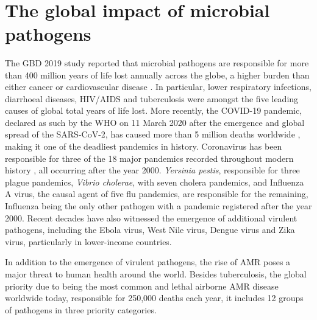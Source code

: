 \mbox{}\\
\vspace{8cm}

\section{The global impact of microbial pathogens} \label{sec:_intro_global_impact}

The \ac{GBD} 2019 study reported that microbial pathogens are responsible for more than 400 million years of life lost annually across the globe, a higher burden than either cancer or cardiovascular disease \citep{vos_global_2020}. 
In particular, lower respiratory infections, diarrhoeal diseases, HIV/AIDS and tuberculosis were amongst the five leading causes of global total years of life lost. 
More recently, the COVID-19 pandemic, declared as such by the \ac{WHO} on 11 March 2020 after the emergence and global spread of the \ac{SARS-CoV-2}, has caused more than 5 million deaths worldwide \citep{ritchie_coronavirus_2020}, making it one of the deadliest pandemics in history.
Coronavirus has been responsible for three of the 18 major pandemics recorded throughout modern history \citep{piret_pandemics_2021}, all occurring after the year 2000.
\textit{Yersinia pestis}, responsible for three plague pandemics, \textit{Vibrio cholerae}, with seven cholera pandemics, and Influenza A virus, the causal agent of five flu pandemics, are responsible for the remaining, Influenza being the only other pathogen with a pandemic registered after the year 2000. 
Recent decades have also witnessed the emergence of additional virulent pathogens, including the Ebola virus, West Nile virus, Dengue virus and Zika virus, particularly in lower-income countries.

In addition to the emergence of virulent pathogens, the rise of \ac{AMR} poses a major threat to human health around the world. 
Besides tuberculosis, the global priority due to being the most common and lethal airborne \ac{AMR} disease worldwide today, responsible for 250,000 deaths each year, it includes 12 groups of pathogens in three priority categories. 

